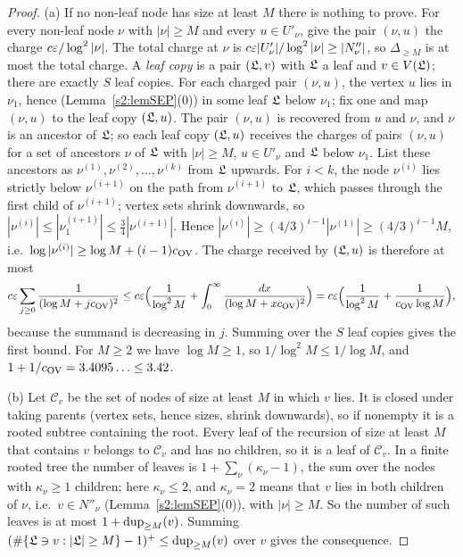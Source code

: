 \begin{proof}
(a) If no non-leaf node has size at least $M$ there is nothing to prove. For
every non-leaf node $\nu$ with $|\nu|\ge M$ and every $u\in U'_\nu$, give the
pair $(\nu,u)$ the charge $c\varepsilon/\log^2|\nu|$. The total charge at $\nu$ is
$c\varepsilon|U'_\nu|/\log^2|\nu|\ge|N''_\nu|$, so $\Delta_{\ge M}$ is at most the
total charge. A \emph{leaf copy} is a pair $(\mathfrak{L},v)$ with $\mathfrak{L}$ a leaf and
$v\in V(\mathfrak{L})$; there are exactly $S$ leaf copies. For each charged pair
$(\nu,u)$, the vertex $u$ lies in $\nu_1$, hence (Lemma~\ref{s2:lemSEP}(0)) in
some leaf $\mathfrak{L}$ below $\nu_1$; fix one and map $(\nu,u)$ to the leaf copy
$(\mathfrak{L},u)$. The pair $(\nu,u)$ is recovered from $u$ and $\nu$, and $\nu$ is
an ancestor of $\mathfrak{L}$; so each leaf copy $(\mathfrak{L},u)$ receives the charges of
pairs $(\nu,u)$ for a set of ancestors $\nu$ of $\mathfrak{L}$ with $|\nu|\ge M$,
$u\in U'_\nu$ and $\mathfrak{L}$ below $\nu_1$. List these ancestors as
$\nu^{(1)},\nu^{(2)},\dots,\nu^{(k)}$ from $\mathfrak{L}$ upwards. For $i<k$, the
node $\nu^{(i)}$ lies strictly below $\nu^{(i+1)}$ on the path from
$\nu^{(i+1)}$ to $\mathfrak{L}$, which passes through the first child of
$\nu^{(i+1)}$; vertex sets shrink downwards, so
$|\nu^{(i)}|\le|\nu^{(i+1)}_1|\le\frac34|\nu^{(i+1)}|$. Hence
$|\nu^{(i)}|\ge(4/3)^{i-1}|\nu^{(1)}|\ge(4/3)^{i-1}M$, i.e.\
$\log|\nu^{(i)}|\ge\log M+(i-1)c_{\mathrm{OV}}$. The charge received by $(\mathfrak{L},u)$ is
therefore at most
\[
c\varepsilon\sum_{j\ge0}\frac1{(\log M+jc_{\mathrm{OV}})^2}\le
c\varepsilon\Bigl(\frac1{\log^2M}+\int_0^\infty\frac{dx}{(\log M+xc_{\mathrm{OV}})^2}\Bigr)
=c\varepsilon\Bigl(\frac1{\log^2M}+\frac1{c_{\mathrm{OV}}\log M}\Bigr),
\]
because the summand is decreasing in $j$. Summing over the $S$ leaf copies
gives the first bound. For $M\ge2$ we have $\log M\ge1$, so
$1/\log^2M\le1/\log M$, and $1+1/c_{\mathrm{OV}}=3.4095\ldots\le3.42$.

(b) Let $\mathcal{C}_v$ be the set of nodes of size at least $M$ in which $v$ lies. It
is closed under taking parents (vertex sets, hence sizes, shrink downwards), so
if nonempty it is a rooted subtree containing the root. Every leaf of the
recursion of size at least $M$ that contains $v$ belongs to $\mathcal{C}_v$ and has no
children, so it is a leaf of $\mathcal{C}_v$. In a finite rooted tree the number of
leaves is $1+\sum_\nu(\kappa_\nu-1)$, the sum over the nodes with
$\kappa_\nu\ge1$ children; here $\kappa_\nu\le2$, and $\kappa_\nu=2$ means that
$v$ lies in both children of $\nu$, i.e.\ $v\in N''_\nu$
(Lemma~\ref{s2:lemSEP}(0)), with $|\nu|\ge M$. So the number of such leaves is
at most $1+\mathrm{dup}_{\ge M}(v)$. Summing $(\#\{\mathfrak{L}\ni v:|\mathfrak{L}|\ge M\}-1)^+\le
\mathrm{dup}_{\ge M}(v)$ over $v$ gives the consequence.


\end{proof}
